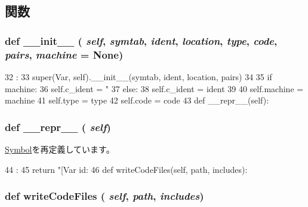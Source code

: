 \subsection{関数}
\hypertarget{classslicc_1_1symbols_1_1Var_1_1Var_ac775ee34451fdfa742b318538164070e}{
\subsubsection[{\_\-\_\-init\_\-\_\-}]{\setlength{\rightskip}{0pt plus 5cm}def \_\-\_\-init\_\-\_\- ( {\em self}, \/   {\em symtab}, \/   {\em ident}, \/   {\em location}, \/   {\em type}, \/   {\em code}, \/   {\em pairs}, \/   {\em machine} = {\ttfamily None})}}
\label{classslicc_1_1symbols_1_1Var_1_1Var_ac775ee34451fdfa742b318538164070e}



\begin{DoxyCode}
32                               :
33         super(Var, self).__init__(symtab, ident, location, pairs)
34 
35         if machine:
36             self.c_ident = "%
37         else:
38             self.c_ident = ident
39 
40         self.machine = machine
41         self.type = type
42         self.code = code
43 
    def __repr__(self):
\end{DoxyCode}
\hypertarget{classslicc_1_1symbols_1_1Var_1_1Var_ad8b9328939df072e4740cd9a63189744}{
\subsubsection[{\_\-\_\-repr\_\-\_\-}]{\setlength{\rightskip}{0pt plus 5cm}def \_\-\_\-repr\_\-\_\- ( {\em self})}}
\label{classslicc_1_1symbols_1_1Var_1_1Var_ad8b9328939df072e4740cd9a63189744}


\hyperlink{classslicc_1_1symbols_1_1Symbol_1_1Symbol_ad8b9328939df072e4740cd9a63189744}{Symbol}を再定義しています。


\begin{DoxyCode}
44                       :
45         return "[Var id: %
46 
    def writeCodeFiles(self, path, includes):
\end{DoxyCode}
\hypertarget{classslicc_1_1symbols_1_1Var_1_1Var_a69d0582bde832d4ff45237ab5ff116bb}{
\subsubsection[{writeCodeFiles}]{\setlength{\rightskip}{0pt plus 5cm}def writeCodeFiles ( {\em self}, \/   {\em path}, \/   {\em includes})}}
\label{classslicc_1_1symbols_1_1Var_1_1Var_a69d0582bde832d4ff45237ab5ff116bb}



